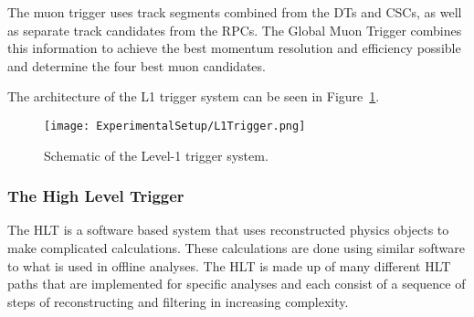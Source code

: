 The muon trigger uses track segments combined from the DTs and CSCs, as well as separate track candidates from the RPCs. The Global Muon Trigger combines this information to achieve the best momentum resolution and efficiency possible and determine the four best muon candidates.
 
The architecture of the L1 trigger system can be seen in Figure~\ref{fig:L1Trigger}.

\begin{figure}[htbp]
\begin{center}
\texttt{[image: ExperimentalSetup/L1Trigger.png]}
\end{center}
\caption{Schematic of the Level-1 trigger system.}
\label{fig:L1Trigger}
\end{figure}

\subsubsection{The High Level Trigger}

The HLT is a software based system that uses reconstructed physics objects to make complicated calculations. These calculations are done using similar software to what is used in offline analyses. The HLT is made up of many different HLT paths that are implemented for specific analyses and each consist of a sequence of steps of reconstructing and filtering in increasing complexity. 


